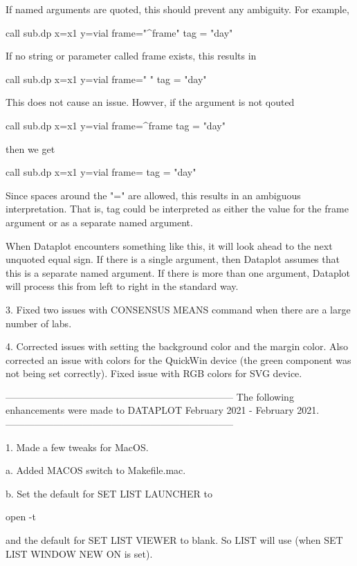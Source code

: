         If named arguments are quoted, this should prevent any
        ambiguity.  For example,

            call sub.dp   x=x1  y=vial  frame="^frame" tag = "day"

        If no string or parameter called frame exists, this results in

            call sub.dp   x=x1  y=vial  frame=" " tag = "day"

        This does not cause an issue.  Howver, if the argument is not
        qouted

            call sub.dp   x=x1  y=vial  frame=^frame tag = "day"

        then we get

            call sub.dp   x=x1  y=vial  frame=  tag = "day"

        Since spaces around the "=" are allowed, this results in an
        ambiguous interpretation.  That is, tag could be interpreted
        as either the value for the frame argument or as a separate
        named argument.

        When Dataplot encounters something like this, it will look
        ahead to the next unquoted equal sign.  If there is a single
        argument, then Dataplot assumes that this is a separate named
        argument.  If there is more than one argument, Dataplot will
        process this from left to right in the standard way.

 3. Fixed two issues with CONSENSUS MEANS command when there are a large
    number of labs.

 4. Corrected issues with setting the background color and the margin
    color.  Also corrected an issue with colors for the QuickWin device
    (the green component was not being set correctly).  Fixed issue with
    RGB colors for SVG device.

-----------------------------------------------------------------------
The following enhancements were made to DATAPLOT
February 2021 - February 2021.
-----------------------------------------------------------------------

 1. Made a few tweaks for MacOS.

    a. Added MACOS switch to Makefile.mac.

    b. Set the default for SET LIST LAUNCHER to

           open -t

       and the default for SET LIST VIEWER to blank.  So LIST
       will use (when SET LIST WINDOW NEW ON is set).

